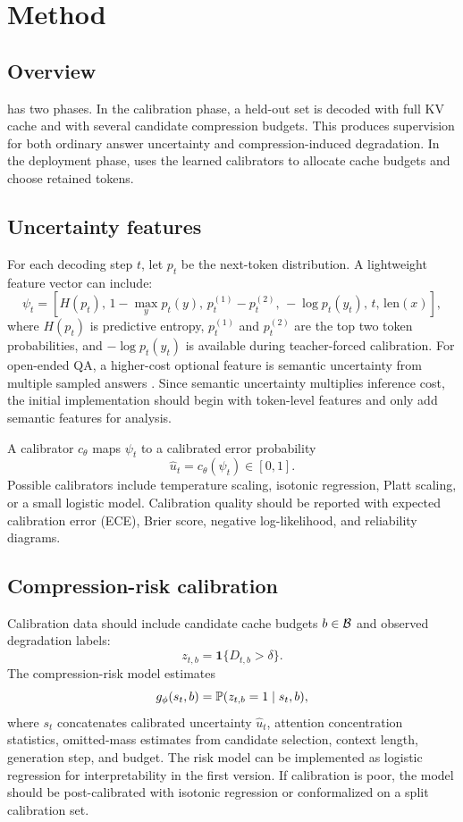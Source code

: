 \section{Method}

\subsection{Overview}

\uckv{} has two phases. In the calibration phase, a held-out set is decoded with full KV cache and with several candidate compression budgets. This produces supervision for both ordinary answer uncertainty and compression-induced degradation. In the deployment phase, \uckv{} uses the learned calibrators to allocate cache budgets and choose retained tokens.

\subsection{Uncertainty features}

For each decoding step $t$, let $p_t$ be the next-token distribution. A lightweight feature vector can include:
\[
\psi_t =
\left[
H(p_t),\,
1-\max_y p_t(y),\,
p_t^{(1)}-p_t^{(2)},\,
-\log p_t(y_t),\,
t,\,
\mathrm{len}(x)
\right],
\]
where $H(p_t)$ is predictive entropy, $p_t^{(1)}$ and $p_t^{(2)}$ are the top two token probabilities, and $-\log p_t(y_t)$ is available during teacher-forced calibration. For open-ended QA, a higher-cost optional feature is semantic uncertainty from multiple sampled answers \citep{farquhar2024detecting}. Since semantic uncertainty multiplies inference cost, the initial implementation should begin with token-level features and only add semantic features for analysis.

A calibrator $c_{\theta}$ maps $\psi_t$ to a calibrated error probability
\[
\hat{u}_t = c_{\theta}(\psi_t) \in [0,1].
\]
Possible calibrators include temperature scaling, isotonic regression, Platt scaling, or a small logistic model. Calibration quality should be reported with expected calibration error (ECE), Brier score, negative log-likelihood, and reliability diagrams.

\subsection{Compression-risk calibration}

Calibration data should include candidate cache budgets $b \in \mathcal{B}$ and observed degradation labels:
\[
z_{t,b} = \mathbf{1}\{D_{t,b} > \delta\}.
\]
The compression-risk model estimates
\[
g_{\phi}(s_t,b) = \mathbb{P}(z_{t,b}=1 \mid s_t,b),
\]
where $s_t$ concatenates calibrated uncertainty $\hat{u}_t$, attention concentration statistics, omitted-mass estimates from candidate selection, context length, generation step, and budget. The risk model can be implemented as logistic regression for interpretability in the first version. If calibration is poor, the model should be post-calibrated with isotonic regression or conformalized on a split calibration set.

